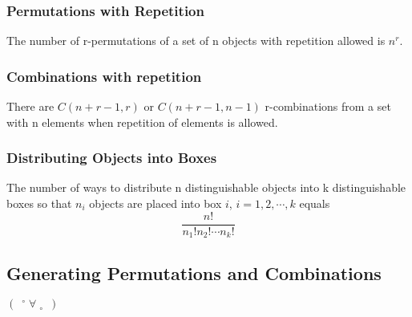 \subsubsection{Permutations with Repetition}
\begin{theorem}
    The number of r-permutations of a set of n objects with repetition allowed is $n^r$. 
\end{theorem}

\subsubsection{Combinations with repetition}
\begin{theorem}
    There are $C(n+r-1,r)$ or $C(n+r-1,n-1)$ r-combinations from a set with n elements when repetition of elements is allowed. 
\end{theorem}

\subsubsection{Distributing Objects into Boxes}
\begin{theorem}
    The number of ways to distribute n distinguishable objects into k distinguishable boxes so that $n_i$ objects are placed into box $i$, $i=1,2,\cdots,k$ equals
    \[ \frac{n!}{n_1!n_2!\cdots n_k!} \]
\end{theorem}

\subsection{Generating Permutations and Combinations}
$\left(\enspace{}^{\circ}\;\forall\;{}_{\circ}\enspace\right)$
